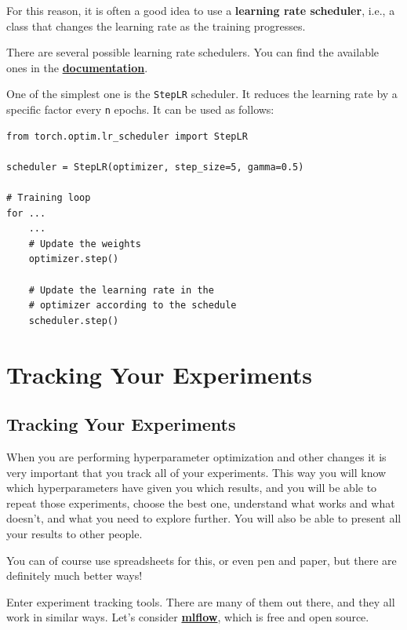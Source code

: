For this reason, it is often a good idea to use a \textbf{learning rate scheduler}, i.e., a class that changes the learning rate as the training progresses. \newline

There are several possible learning rate schedulers. You can find the available ones in the \href{https://pytorch.org/docs/stable/optim.html\#how-to-adjust-learning-rate}{\textbf{documentation}}. \newline

One of the simplest one is the \lstinline{StepLR} scheduler. It reduces the learning rate by a specific factor every \lstinline{n} epochs. It can be used as follows:
\begin{lstlisting}
from torch.optim.lr_scheduler import StepLR

scheduler = StepLR(optimizer, step_size=5, gamma=0.5)

# Training loop
for ... 
    ...
    # Update the weights
    optimizer.step()

    # Update the learning rate in the
    # optimizer according to the schedule
    scheduler.step()
\end{lstlisting}
\section{Tracking Your Experiments}

\subsection{Tracking Your Experiments}

When you are performing hyperparameter optimization and other changes it is very important that you track all of your experiments. This way you will know which hyperparameters have given you which results, and you will be able to repeat those experiments, choose the best one, understand what works and what doesn't, and what you need to explore further. You will also be able to present all your results to other people.\newline

You can of course use spreadsheets for this, or even pen and paper, but there are definitely much better ways!\newline

Enter experiment tracking tools. There are many of them out there, and they all work in similar ways. Let's consider \href{https://www.mlflow.org/docs/latest/tracking.html}{\textbf{mlflow}}, which is free and open source.\newline

